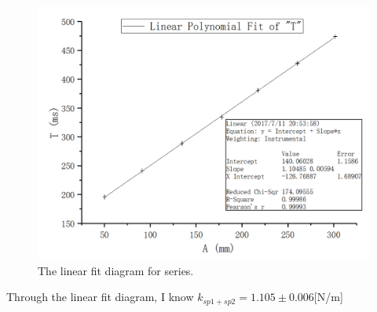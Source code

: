 \documentclass[12pt]{article}
\begin{document}
\begin{figure}[H]
\centering
\includegraphics[scale=0.4]{P7.jpg}
\caption{The linear fit diagram for series.}
\end{figure}
Through the linear fit diagram, I know $k_{sp1+sp2}=1.105\pm0.006$[N/m] 
\end{document}

